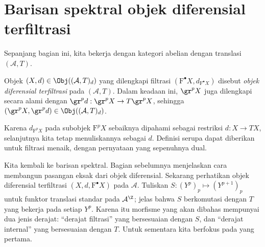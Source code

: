
\section{Barisan spektral objek diferensial terfiltrasi}
\label{sec:filtered-diff-ss}
\hypertarget{o014.aljabr2.chapter5.filtered-differential-spectral-sequence}{ }

Sepanjang bagian ini, kita bekerja dengan kategori abelian dengan translasi
$(\mathcal{A},T)$.

\begin{definition}\label{def:filtered-diffop}
	Objek $(X,d)\in\Obj((\mathcal{A},T)_d)$ yang dilengkapi filtrasi
	$\left(\mathrm{F}^\bullet X,d_{\mathrm{F}^\bullet X}\right)$ disebut
	\emph{objek diferensial terfiltrasi} pada $(\mathcal{A},T)$. Dalam keadaan
	ini, $\gr^pX$ juga dilengkapi secara alami dengan
	$\gr^pd:\gr^pX\to T\gr^pX$, sehingga
	$(\gr^pX,\gr^pd)\in\Obj((\mathcal{A},T)_d)$.
\end{definition}

Karena $d_{\mathrm{F}^pX}$ pada subobjek $\mathrm{F}^pX$ sebaiknya dipahami
sebagai restriksi $d:X\to TX$, selanjutnya kita tetap menuliskannya sebagai
$d$. Definisi serupa dapat diberikan untuk filtrasi menaik, dengan pernyataan
yang sepenuhnya dual.

Kita kembali ke barisan spektral. Bagian sebelumnya menjelaskan cara membangun
pasangan eksak dari objek diferensial. Sekarang perhatikan objek diferensial
terfiltrasi $(X,d,\mathrm{F}^\bullet X)$ pada $\mathcal{A}$. Tuliskan
$S:(Y^p)_p\mapsto(Y^{p+1})_p$ untuk funktor translasi standar pada
$\mathcal{A}^{\Z}$; jelas bahwa $S$ berkomutasi dengan $T$ yang bekerja pada
setiap $Y^p$. Karena itu morfisme yang akan dibahas mempunyai dua jenis
derajat: ``derajat filtrasi'' yang bersesuaian dengan $S$, dan ``derajat
internal'' yang bersesuaian dengan $T$. Untuk sementara kita berfokus pada
yang pertama.

